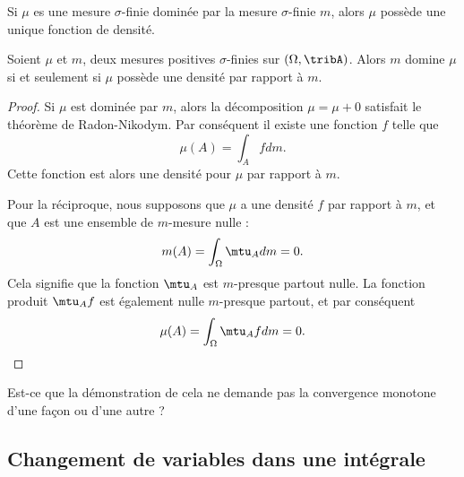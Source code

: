 \begin{corollary}   \label{CorZDkhwS}
    Si \( \mu\) es une mesure \( \sigma\)-finie dominée par la mesure \( \sigma\)-finie \( m\), alors \( \mu\) possède une unique fonction de densité.
\end{corollary}

\begin{corollary}       \label{CorDomDens}
    Soient \( \mu\) et \( m\), deux mesures positives \( \sigma\)-finies sur \( (\Omega,\tribA)\). Alors \( m\) domine \( \mu\) si et seulement si \( \mu\) possède une densité par rapport à \( m\).
\end{corollary}
 
\begin{proof}
    Si \( \mu\) est dominée par \( m\), alors la décomposition \( \mu=\mu+0\) satisfait le théorème de Radon-Nikodym. Par conséquent il existe une fonction \( f\) telle que
    \begin{equation}
        \mu(A)=\int_Afdm.
    \end{equation}
    Cette fonction est alors une densité pour \( \mu\) par rapport à \( m\).

    Pour la réciproque, nous supposons que \( \mu\) a une densité \( f\) par rapport à \( m\), et que \( A\) est une ensemble de \( m\)-mesure nulle :
    \begin{equation}
        m(A)=\int_{\Omega}\mtu_Adm=0.
    \end{equation}
    Cela signifie que la fonction \( \mtu_A\) est \( m\)-presque partout nulle. La fonction produit \( \mtu_Af\) est également nulle \( m\)-presque partout, et par conséquent
    \begin{equation}
        \mu(A)=\int_{\Omega}\mtu_Afdm=0.
    \end{equation}
\end{proof}

\begin{probleme}
    Est-ce que la démonstration de cela ne demande pas la convergence monotone d'une façon ou d'une autre ?
\end{probleme}

\subsection{Changement de variables dans une intégrale}

